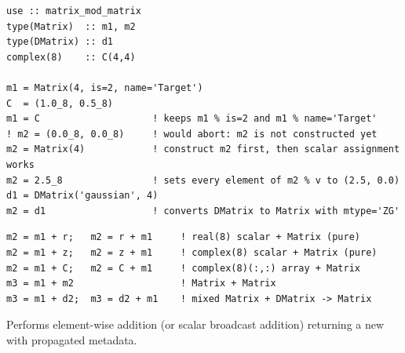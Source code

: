 \begin{description}[leftmargin=2.2cm, style=nextline]
\end{description}

\lstset{language=[95]Fortran}
\begin{lstlisting}
use :: matrix_mod_matrix
type(Matrix)  :: m1, m2
type(DMatrix) :: d1
complex(8)    :: C(4,4)

m1 = Matrix(4, is=2, name='Target')
C  = (1.0_8, 0.5_8)
m1 = C                    ! keeps m1 % is=2 and m1 % name='Target'
! m2 = (0.0_8, 0.0_8)     ! would abort: m2 is not constructed yet
m2 = Matrix(4)            ! construct m2 first, then scalar assignment works
m2 = 2.5_8                ! sets every element of m2 % v to (2.5, 0.0)
d1 = DMatrix('gaussian', 4)
m2 = d1                   ! converts DMatrix to Matrix with mtype='ZG'
\end{lstlisting}



\lstset{language=[95]Fortran}
\begin{lstlisting}
m2 = m1 + r;   m2 = r + m1     ! real(8) scalar + Matrix (pure)
m2 = m1 + z;   m2 = z + m1     ! complex(8) scalar + Matrix (pure)
m2 = m1 + C;   m2 = C + m1     ! complex(8)(:,:) array + Matrix
m3 = m1 + m2                   ! Matrix + Matrix
m3 = m1 + d2;  m3 = d2 + m1    ! mixed Matrix + DMatrix -> Matrix
\end{lstlisting}

Performs element-wise addition (or scalar broadcast addition) returning a new  with propagated metadata.

